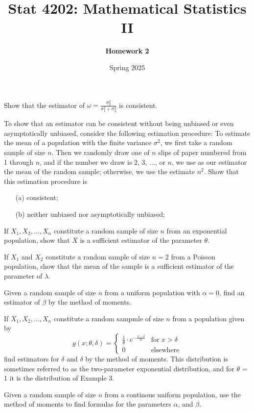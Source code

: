 \documentclass[11pt]{article}
\title{Stat 4202: Mathematical Statistics II}
\author{\textbf{Homework 2}}
\date{Spring 2025}
\begin{document}
\maketitle
\begin{question}[10.38]
    Show that the estimator of \(\omega = \frac{\sigma_2^2}{\sigma_1^2 + \sigma_2^2}\) is consistent.
\end{question}

\begin{question}
    To show that an estimator can be consistent without being unbiased or even asymptotically unbiased, consider the following estimation procedure: To estimate the mean of a population with the finite variance $\sigma^2$, we first take a random sample of size $n$. Then we randomly draw one of $n$ slips of paper numbered from 1 through $n$, and if the number we draw is 2, 3, \(\ldots\), or $n$, we use as our estimator the mean of the random sample; otherwise, we use the estimate $n^2$. Show that this estimation procedure is
    \begin{itemize}
        \item [(a)] consistent;
        \item [(b)] neither unbiased nor asymptotically unbiased;
    \end{itemize}
\end{question}
\begin{question}
    If $X_1, X_2, \ldots, X_n$ constitute a random sample of size $n$ from an exponential population, show that $\overline{X}$ is a sufficient estimator of the parameter $\theta$.
\end{question}
\begin{question}
    If \(X_1\) and \(X_2\) constitute a random sample of size \(n = 2\) from a Poisson population, show that the mean of the sample is a sufficient estimator of the parameter of \(\lambda\).
\end{question}
\begin{question}
    Given a random sample of size \(n\) from a uniform population with \(\alpha = 0\), find an estimator of \(\beta\) by the method of moments.
\end{question}
\begin{question}
    If \(X_1, X_2, \ldots, X_n\) constitute a random sampmle of size \(n\) from a population given by 
    \[
g(x; \theta, \delta) = \begin{cases}
\frac{1}{\theta} \cdot e^{-\frac{x - \delta}{\theta}} & \text{for } x > \delta \\
0 & \text{elsewhere}
\end{cases}
\]
find estimators for \(\delta\) and \(\delta\) by the method of moments. This distribution is sometimes referred to as the two-parameter exponential distribution, and for \(\theta\) = 1 it is the distribution of Example 3.
\end{question}

\begin{question}
    Given a random sample of size \(n\) from a continous uniform population, use the method of moments to find formulas for the parameters \(\alpha\), and \(\beta\).
\end{question}
\end{document}
